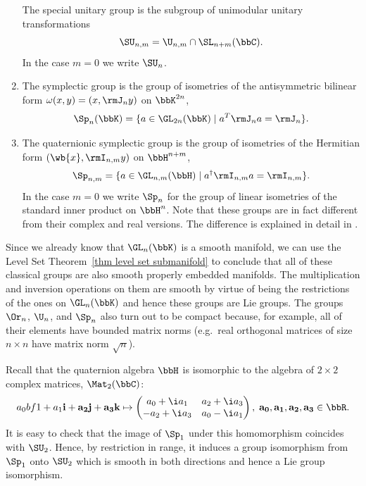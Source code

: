\begin{example}
\begin{enumerate}
        The special unitary group is the subgroup of unimodular unitary transformations
        \[\SU_{n,m}=\U_{n,m}\cap \SL_{n+m}(\bbC).\]
        In the case $m=0$ we write $\SU_n$.
        \item The symplectic group is the group of isometries of the antisymmetric bilinear form $\omega(x,y)=(x,\rmJ_n y)$ on $\bbK^{2n}$,
        \[\Sp_n(\bbK)=\{a\in\GL_{2n}(\bbK)\mid a^T \rmJ_n a=\rmJ_n\}.\]
        \item The quaternionic symplectic group is the group of isometries of the Hermitian form $(\wb{x},\rmI_{n,m}y)$ on $\bbH^{n+m}$,
        \[\Sp_{n,m}=\{a\in\GL_{n,m}(\bbH)\mid a^\dagger \rmI_{n,m}a=\rmI_{n,m}\}.\]
        In the case $m=0$ we write $\Sp_n$ for the group of linear isometries of the standard inner product on $\bbH^n$. Note that these groups are in fact different from their complex and real versions. The difference is explained in detail in \cite[pp.~5-6]{Sepanski}.
    \end{enumerate}
\end{example}

Since we already know that $\GL_n(\bbK)$ is a smooth manifold, we can use the Level Set Theorem~\ref{thm level set submanifold} to conclude that all of these classical groups are also smooth properly embedded manifolds. The multiplication and inversion operations on them are smooth by virtue of being the restrictions of the ones on $\GL_n(\bbK)$ and hence these groups are Lie groups. The groups $\Or_n$, $\U_n$, and $\Sp_n$ also turn out to be compact because, for example, all of their elements have bounded matrix norms (e.g.~real orthogonal matrices of size $n\times n$ have matrix norm $\sqrt{n}$).


\begin{example}[$\SU_2\cong \Sp_1$]
    Recall that the quaternion algebra $\bbH$ is isomorphic to the algebra of $2\times 2$ complex matrices, $\Mat_2(\bbC)$:
    \[a_0 bf{1}+a_1 \bf{i}+a_2 \bf{j}+a_3 \bf{k}\mapsto
    \begin{pmatrix}
        a_0+\i a_1&a_2+\i a_3\\
        -a_2+\i a_3&a_0-\i a_1
    \end{pmatrix}, \; a_0,a_1,a_2,a_3\in\bbR.\label{46939}
    \]
    It is easy to check that the image of $\Sp_1$ under this homomorphism coincides with $\SU_2$. Hence, by restriction in range, it induces a group isomorphism from $\Sp_1$ onto $\SU_2$ which is smooth in both directions and hence a Lie group isomorphism.
\end{example}


